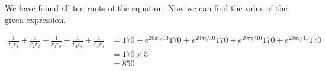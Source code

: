 We have found all ten roots of the equation. Now we can find the value of the given expression.

\begin{align*}
\frac{1}{r_1 \overline{r_1}} + \frac{1}{r_2 \overline{r_2}} + \frac{1}{r_3 \overline{r_3}} + \frac{1}{r_4 \overline{r_4}} + \frac{1}{r_5 \overline{r_5}}
&= 170 + e^{20 \pi i / 10} 170 + e^{20 \pi i / 10} 170 + e^{20 \pi i / 10} 170 + e^{20 \pi i / 10} 170 \\
&= 170 \times 5 \\
&= \boxed{850} \\
\end{align*}
